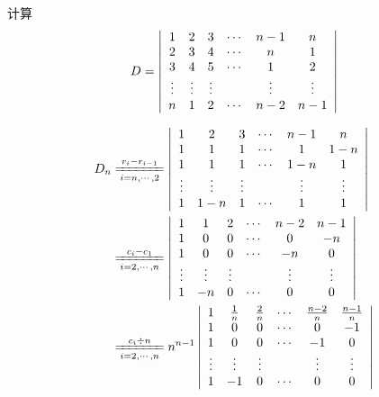 \begin{li}
  计算
  $$
  D = \left |
    \begin{array}{cccccc}
      1 &  2 &  3 & \cd &  n-1 & n\\
      2 &  3 &  4 & \cd &   n  & 1\\
      3 &  4 &  5 & \cd &   1  & 2\\
      \vd& \vd& \vd&     & \vd  & \vd \\
      n &  1 &  2 & \cd & n-2  & n-1
    \end{array}
  \right|
  $$
\end{li}
\begin{jie}
  $$
  \begin{aligned}
    D_n &   
    \xlongequal[i=n,\cdots,2]{r_i-r_{i-1}} 
    \left|
      \begin{array}{cccccc}
        1   &  2 &  3 & \cd &  n-1 & n\\
        1   &  1 &  1 & \cd &   1  & 1-n \\
        1   &  1 &  1 & \cd &  1-n  & 1\\
        \vd & \vd & \vd&     & \vd  & \vd \\
        1   & 1-n &  1 & \cd &   1   & 1
      \end{array}
    \right|\\
    &  
    \xlongequal[i=2,\cdots,n]{c_i-c_1} 
    \left|
      \begin{array}{cccccc}
        1   &  1 &  2 & \cd &  n-2 & n-1\\
        1   &  0 &  0 & \cd &   0  & -n \\
        1   &  0 &  0 & \cd &  -n  & 0\\
        \vd & \vd & \vd&     & \vd  & \vd \\
        1   & -n &  0 & \cd &   0   & 0
      \end{array}
    \right|\\
    &   \xlongequal[i=2,\cd,n]{c_i\div n} n^{n-1} 
    \left|
      \begin{array}{cccccc}
        1   &  \frac 1n & \frac 2n & \cd &  \frac{n-2}n & \frac{n-1}n\\
        1   &  0 &  0 & \cd &   0  & -1 \\
        1   &  0 &  0 & \cd &  -1  & 0\\
        \vd & \vd & \vd&     & \vd  & \vd \\
        1   & -1 &  0 & \cd &   0   & 0
      \end{array}
    \right|\\

\end{aligned}$$
\end{jie}
